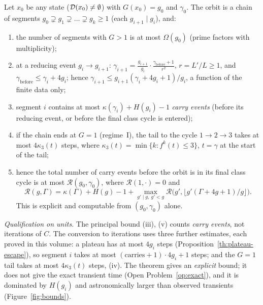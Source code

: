 \begin{theorem}\label{thm:dynG}
Let \(x_0\) be any state (\(\mathcal{D}(x_0)\ne\emptyset\)) with \(G(x_0)=g_0\) and \(\gamma_0\). The orbit is a chain of segments \(g_0\supsetneq g_1\supsetneq\dots\supsetneq g_k\ge1\) (each \(g_{i+1}\mid g_i\)), and:
\begin{enumerate}[label=(\roman*),nosep]
\item the number of segments with \(G>1\) is at most \(\Omega(g_0)\) (prime factors with multiplicity);
\item at a reducing event \(g_i\to g_{i+1}\): \(\gamma_{i+1}=\frac{g_{i+1}}{g_i}\cdot\frac{\gamma_{\mathrm{before}}+1}{r^2}\), \(r=L'/L\ge1\), and \(\gamma_{\mathrm{before}}\le\gamma_i+4g_i\); hence \(\gamma_{i+1}\le g_{i+1}(\gamma_i+4g_i+1)/g_i\), a function of the finite data only;
\item segment \(i\) contains at most \(\kappa(\gamma_i)+H(g_i)-1\) \emph{carry events} (before its reducing event, or before the final class cycle is entered);
\item if the chain ends at \(G=1\) (regime~I), the tail to the cycle \(1\to2\to3\) takes at most \(4\kappa_3(t)\) steps, where \(\kappa_3(t)=\min\{k:f^k(t)\le3\}\), \(t=\gamma\) at the start of the tail;
\item hence the total number of carry events before the orbit is in its final class cycle is at most \(\mathcal R(g_0,\gamma_0)\), where \(\mathcal R(1,\cdot)=0\) and
\[
\mathcal R(g,\Gamma)=\kappa(\Gamma)+H(g)-1+\max_{g'\mid g,\ g'<g}\mathcal R\big(g',\lfloor g'(\Gamma+4g+1)/g\rfloor\big).
\]
This is explicit and computable from \((g_0,\gamma_0)\) alone.
\end{enumerate}
\emph{Qualification on units.} The principal bound (iii), (v) counts \emph{carry events}, not iterations of \(C\). The conversion to iterations uses three further estimates, each proved in this volume: a plateau has at most \(4g_i\) steps (Proposition~\ref{th:plateau-escape}), so segment \(i\) takes at most \((\text{carries}+1)\cdot4g_i+1\) steps; and the \(G=1\) tail takes at most \(4\kappa_3(t)\) steps, (iv). The theorem gives an \emph{explicit} bound; it does not give the exact transient time (Open Problem~\ref{op:exact}), and it is dominated by \(H(g_i)\) and astronomically larger than observed transients (Figure~\ref{fig:bounds}).
\end{theorem}
